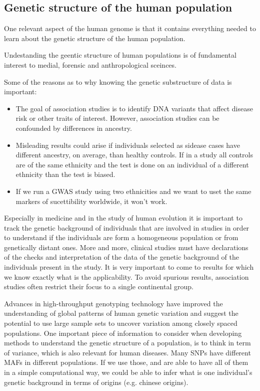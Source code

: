 \subsection{Genetic structure of the human population}

One relevant aspect of the human genome is that it contains everything needed to learn about the genetic structure of the human population. 

Undestanding the geentic structure of human populations is of fundamental interest to medial, forensic and anthropological sceinces. 

Some of the reasons as to why knowing the genetic substructure of data is important:
\begin{itemize}
	\item The goal of association studies is to identify DNA variants that affect disease risk or other traits of interest. However, association studies can be confounded by differences in ancestry.
	\item Misleading results could arise if individuals selected as sidease cases have different ancestry, on average, than healthy controls. If in a study all controls are of the same ethnicity and the test is done on an individual of a different ethnicity than the test is biased.
 	\item If we run a GWAS study using two ethnicities and we want to uset the same markers of sucettibility worldwide, it won't work. 
\end{itemize}

Especially in medicine and in the study of human evolution it is important to track the genetic background of individuals that are involved in studies in order to understand if the individuals are form a homogeneous population or from genetically distant ones. 
More and more, clinical studies must have declarations of the checks and interpretation of the data of the genetic background of the individuals present in the study. It is very important to come to results for which we know exactly what is the applicability. To avoid spurious results, association studies often restrict their focus to a single continental group. 

Advances in high-throughput genotyping technology have improved the understanding of global patterns of human genetic variation and suggest the potential to use large sample sets to uncover variation among closely spaced populations.
One important piece of information to consider when developing methods to understand the genetic structure of a population, is to think in term of variance, which is also relevant for human diseases. 
Many SNPs have different MAFs in different populations. If we use those, and are able to have all of them in a simple computational way, we could be able to infer what is one individual's genetic background in terms of origins (e.g. chinese origins). 


